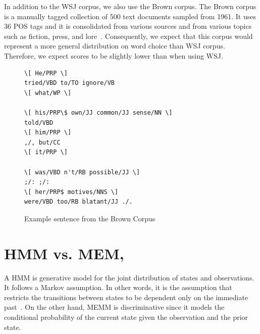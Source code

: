 \documentclass{acm_proc_article-sp}
\begin{document}
In addition to the WSJ corpus, we also use the Brown corpus. The Brown corpus is a manually tagged collection of 500 text documents sampled from 1961. It uses 36 POS tags and it is consolidated from various sources and from various topics such as fiction, press, and lore~\cite{brownCorpus}. Consequently, we expect that this corpus would represent a more general distribution on word choice than WSJ corpus. Therefore, we expect scores to be slightly lower than when using WSJ.

\begin{figure}[ht]
 \begin{Verbatim}[frame=single,framesep=5mm]
\[ He/PRP \]
tried/VBD to/TO ignore/VB 
\[ what/WP \]

\[ his/PRP\$ own/JJ common/JJ sense/NN \]
told/VBD 
\[ him/PRP \]
,/, but/CC 
\[ it/PRP \]

\[ was/VBD n't/RB possible/JJ \]
;/: ;/: 
\[ her/PRP$ motives/NNS \]
were/VBD too/RB blatant/JJ ./.
\end{Verbatim}
\caption{Example sentence from the Brown Corpus~\cite{brownCorpus} \label{brownExample}}
\end{figure}

\section{HMM vs. MEM,}
A HMM is generative model for the joint distribution of states and observations. It follows a Markov assumption. In other words, it is the assumption that restricts the transitions between states to be dependent only on the immediate past~\cite{nlpBook}. On the other hand, MEMM is discriminative since it models the conditional probability of the current state given the observation and the prior state. 
\end{document}
